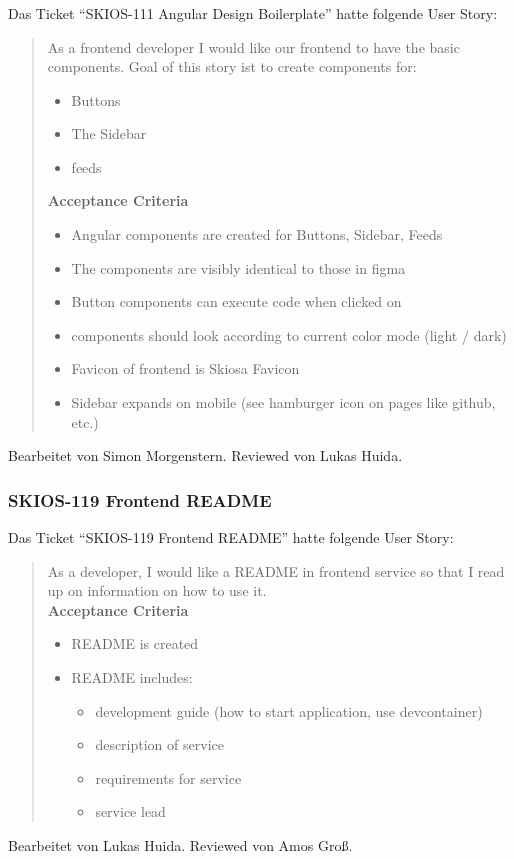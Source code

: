 \subsubsection{}
Das Ticket \enquote{SKIOS-111 Angular Design Boilerplate} hatte folgende User Story:
\begin{quotation}
    As a frontend developer I would like our frontend to have the basic components.
    Goal of this story ist to create components for:
    \begin{itemize}
        \item Buttons
        \item The Sidebar
        \item feeds
    \end{itemize}
\textbf{Acceptance Criteria}
\begin{itemize}
    \item Angular components are created for Buttons, Sidebar, Feeds
    \item The components are visibly identical to those in figma
    \item Button components can execute code when clicked on
    \item components should look according to current color mode (light / dark)
    \item Favicon of frontend is Skiosa Favicon
    \item Sidebar expands on mobile (see hamburger icon on pages like github, etc.)
\end{itemize}
\end{quotation}
Bearbeitet von Simon Morgenstern.
Reviewed von Lukas Huida.

\subsubsection{SKIOS-119 Frontend README}
Das Ticket \enquote{SKIOS-119 Frontend README} hatte folgende User Story:
\begin{quotation}
    As a developer, I would like a README in frontend service so that I read up on information on how to use it. \\
\textbf{Acceptance Criteria}
\begin{itemize}
    \item README is created
    \item README includes:
    \begin{itemize}
        \item development guide (how to start application, use devcontainer)
        \item description of service
        \item requirements for service
        \item service lead
    \end{itemize}
\end{itemize}
\end{quotation}
Bearbeitet von Lukas Huida.
Reviewed von Amos Groß.

